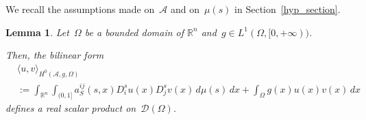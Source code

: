 \documentclass[11pt,hyp,]{nyjm}
\numberwithin{equation}{section}
\newcommand{\R}{\mathbb{R}}
\newtheorem{lemma}[theorem]{Lemma}
\theoremstyle{remark}
\begin{document}
We recall the assumptions made on~$\mathcal{A}$ and on~$\mu(s)$ in Section~\ref{hyp_section}.
\begin{lemma}\label{wieg}
Let~$\Omega$ be a bounded domain of $\R^n$ and~$g \in L^1(\Omega, [0,+\infty))$. 

Then, the bilinear form
				\begin{equation}\label{rc}\begin{split}&
					\langle u, v \rangle_{H^{0}(\mathcal{A}, g, \Omega)}\\& := \int_{\R^n} \int_{(0,1]} a^{ij}_S(s,x) D_i^su(x) D_j^sv(x) \, d\mu(s) \, dx + \int_{\Omega} g (x)u(x)v(x) \, dx \end{split}
				\end{equation}
				defines a real scalar product on~$\mathcal{D}(\Omega)$.
\end{lemma}
\end{document}
